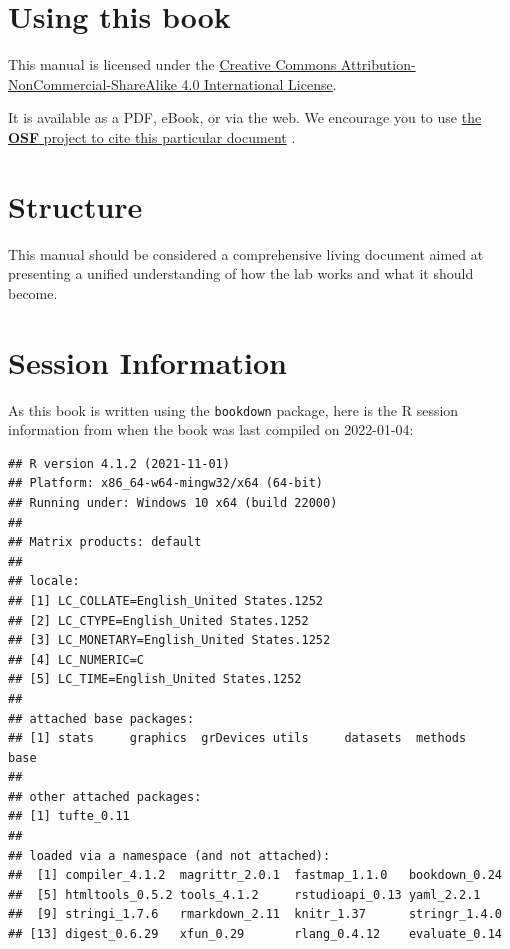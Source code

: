 \documentclass[]{tufte-book}
\begin{document}
\hypertarget{using-this-book}{%
\section*{Using this book}\label{using-this-book}}

This manual is licensed under the \href{http://creativecommons.org/licenses/by-nc-sa/4.0/}{Creative Commons Attribution-NonCommercial-ShareAlike 4.0 International License}.

It is available as a PDF, eBook, or via the web. We encourage you to use \href{https://osf.io/upa25/}{the \textbf{OSF} project to cite this particular document} \citep{straightMAVRXLabManual2021}.

\hypertarget{structure}{%
\section*{Structure}\label{structure}}

This manual should be considered a comprehensive living document aimed at presenting a unified understanding of how the lab works and what it should become.

\hypertarget{session-information}{%
\section*{Session Information}\label{session-information}}

As this book is written using the \texttt{bookdown} package, here is the R session information from when the book was last compiled on 2022-01-04:

\begin{verbatim}
## R version 4.1.2 (2021-11-01)
## Platform: x86_64-w64-mingw32/x64 (64-bit)
## Running under: Windows 10 x64 (build 22000)
## 
## Matrix products: default
## 
## locale:
## [1] LC_COLLATE=English_United States.1252 
## [2] LC_CTYPE=English_United States.1252   
## [3] LC_MONETARY=English_United States.1252
## [4] LC_NUMERIC=C                          
## [5] LC_TIME=English_United States.1252    
## 
## attached base packages:
## [1] stats     graphics  grDevices utils     datasets  methods   base     
## 
## other attached packages:
## [1] tufte_0.11
## 
## loaded via a namespace (and not attached):
##  [1] compiler_4.1.2  magrittr_2.0.1  fastmap_1.1.0   bookdown_0.24  
##  [5] htmltools_0.5.2 tools_4.1.2     rstudioapi_0.13 yaml_2.2.1     
##  [9] stringi_1.7.6   rmarkdown_2.11  knitr_1.37      stringr_1.4.0  
## [13] digest_0.6.29   xfun_0.29       rlang_0.4.12    evaluate_0.14
\end{verbatim}
\end{document}
